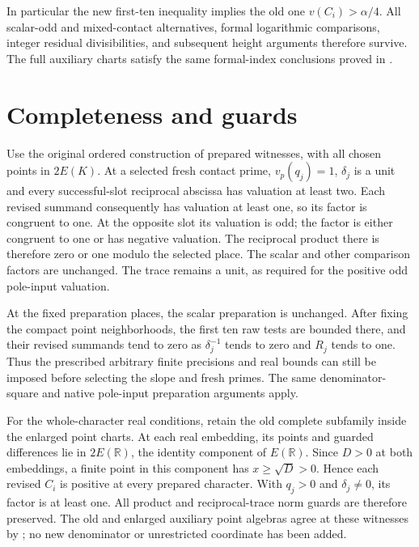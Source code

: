 \documentclass[11pt,a4paper]{article}
\begin{document}
In particular the new first-ten inequality implies the old one
$v(C_i)>\alpha/4$. All scalar-odd and mixed-contact alternatives,
formal logarithmic comparisons, integer residual divisibilities,
and subsequent height arguments therefore survive. The full
auxiliary charts satisfy the same formal-index conclusions proved
in \cite{FullAux}.

\section{Completeness and guards}

Use the original ordered construction of prepared witnesses, with
all chosen points in $2E(K)$. At a selected fresh contact prime,
$v_p(q_j)=1$, $\delta_j$ is a unit and every successful-slot
reciprocal abscissa has valuation at least two. Each revised
summand consequently has valuation at least one, so its factor
is congruent to one. At the opposite slot its valuation is odd;
the factor is either congruent to one or has negative valuation.
The reciprocal product there is therefore zero or one modulo the
selected place. The scalar and other comparison factors are
unchanged. The trace remains a unit, as required for the positive
odd pole-input valuation.

At the fixed preparation places, the scalar preparation is
unchanged. After fixing the compact point neighborhoods, the first
ten raw tests are bounded there, and their revised summands tend to
zero as $\delta_j^{-1}$ tends to zero and $R_j$ tends to one.
Thus the prescribed arbitrary finite precisions and real bounds
can still be imposed before selecting the slope and fresh primes.
The same denominator-square and native pole-input preparation
arguments apply.

For the whole-character real conditions, retain the old complete
subfamily inside the enlarged point charts. At each real embedding,
its points and guarded differences lie in $2E(\mathbb R)$, the
identity component of $E(\mathbb R)$. Since $D>0$ at both
embeddings, a finite point in this component has
$x\ge\sqrt D>0$. Hence each revised $C_i$ is positive at every
prepared character. With $q_j>0$ and $\delta_j\ne0$, its factor
is at least one. All product and reciprocal-trace norm guards are
therefore preserved. The old and enlarged auxiliary point algebras
agree at these witnesses by \cite{FullAux}; no new denominator or
unrestricted coordinate has been added.
\end{document}
